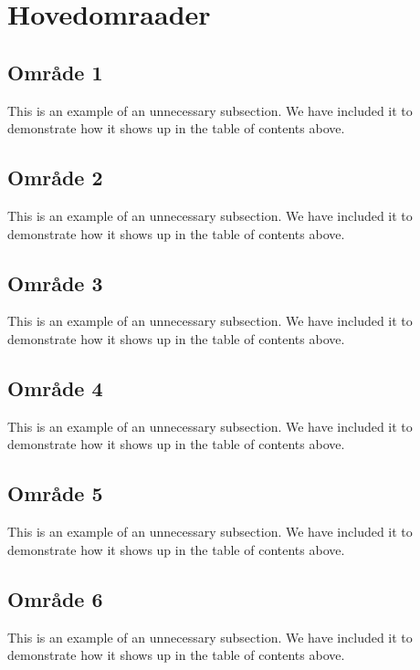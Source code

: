 \section*{Hovedomraader} \label{Sec: Hovedomraader}

\subsection*{Område 1}
    This is an example of an unnecessary subsection. We have included it to demonstrate how it
    shows up in the table of contents above.

\subsection*{Område 2}
    This is an example of an unnecessary subsection. We have included it to demonstrate how it
    shows up in the table of contents above.

\subsection*{Område 3}
    This is an example of an unnecessary subsection. We have included it to demonstrate how it
    shows up in the table of contents above.

\subsection*{Område 4}
    This is an example of an unnecessary subsection. We have included it to demonstrate how it
    shows up in the table of contents above.

\subsection*{Område 5}
    This is an example of an unnecessary subsection. We have included it to demonstrate how it
    shows up in the table of contents above.

\subsection*{Område 6}
    This is an example of an unnecessary subsection. We have included it to demonstrate how it
    shows up in the table of contents above.
